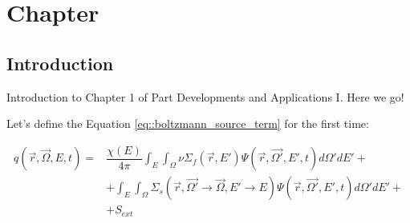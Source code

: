 \chapter{Chapter}
\label{sect:devs01_chapter1}

\section{Introduction}
\label{sect::devs01_chapter1_intro}

Introduction to Chapter 1 of Part Developments and Applications I. Here we go!

Let's define the Equation \ref{eq::boltzmann_source_term} for the first time:

\begin{equation}
	\label{eq::boltzmann_source_term}
   \begin{split}
   q\left(\vec{r},\vec{\Omega},E,t\right)  = &
   \dfrac{\chi(E)}{4\pi}\int_{E}\int_{\Omega}\nu\Sigma_f\left(\vec{r},E'\right)\Psi \left(\vec{r},\vec{\Omega'},E',t\right) d\Omega'dE' + \\
   & + \int_{E}\int_{\Omega}\Sigma_s\left(\vec{r},\vec{\Omega'}\rightarrow \vec{\Omega},E'\rightarrow E\right)\Psi \left(\vec{r},\vec{\Omega'},E',t\right) d\Omega'dE'+ \\
   & + S_{ext}
   \end{split}
\end{equation}